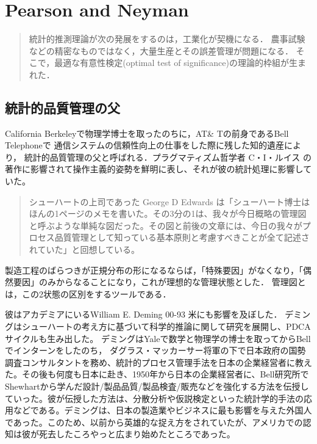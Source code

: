 \documentclass[uplatex,dvipdfmx]{jsreport}
\begin{document}
\chapter{Pearson and Neyman}

\begin{quotation}
    統計的推測理論が次の発展をするのは，工業化が契機になる．
    農事試験などの精密なものではなく，大量生産とその誤差管理が問題になる．
    そこで，最適な有意性検定(optimal test of significance)の理論的枠組が生まれた．
\end{quotation}

\section{統計的品質管理の父}

\begin{history}
    California Berkeleyで物理学博士を取ったのちに，AT\& Tの前身であるBell Telephoneで
    通信システムの信頼性向上の仕事をした際に残した知的遺産により，
    統計的品質管理の父と呼ばれる．プラグマティズム哲学者 C・I・ルイス の著作に影響されて操作主義的姿勢を鮮明に表し、それが彼の統計処理に影響していた。
    \begin{quote}
        シューハートの上司であった George D Edwards は「シューハート博士はほんの1ページのメモを書いた。その3分の1は、我々が今日概略の管理図と呼ぶような単純な図だった。その図と前後の文章には、今日の我々がプロセス品質管理として知っている基本原則と考慮すべきことが全て記述されていた」と回想している。
    \end{quote}
    製造工程のばらつきが正規分布の形になるならば，「特殊要因」がなくなり，「偶然要因」のみからなることになり，これが理想的な管理状態とした．
    管理図とは，この2状態の区別をするツールである．

    彼はアカデミアにいるWilliam E. Deming 00-93 米にも影響を及ぼした．
    デミングはシューハートの考え方に基づいて科学的推論に関して研究を展開し、PDCAサイクルも生み出した。 
    デミングはYaleで数学と物理学の博士を取ってからBellでインターンをしたのち，
    ダグラス・マッカーサー将軍の下で日本政府の国勢調査コンサルタントを務め、統計的プロセス管理手法を日本の企業経営者に教えた。その後も何度も日本に赴き、1950年から日本の企業経営者に、Bell研究所で
    Shewhartから学んだ設計/製品品質/製品検査/販売などを強化する方法を伝授していった。彼が伝授した方法は、分散分析や仮説検定といった統計学的手法の応用などである。デミングは、日本の製造業やビジネスに最も影響を与えた外国人であった。このため、以前から英雄的な捉え方をされていたが、アメリカでの認知は彼が死去したころやっと広まり始めたところであった。
\end{history}
\end{document}
